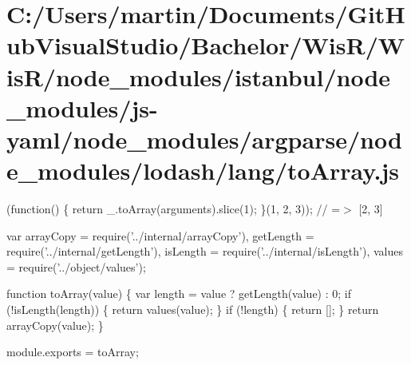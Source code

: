 \hypertarget{_c_1_2_users_2martin_2_documents_2_git_hub_visual_studio_2_bachelor_2_wis_r_2_wis_r_2node_module64fdf711fb5c2588c29c1fc5e6fb5d12}{}\section{C\+:/\+Users/martin/\+Documents/\+Git\+Hub\+Visual\+Studio/\+Bachelor/\+Wis\+R/\+Wis\+R/node\+\_\+modules/istanbul/node\+\_\+modules/js-\/yaml/node\+\_\+modules/argparse/node\+\_\+modules/lodash/lang/to\+Array.\+js}
(function() \{ return \+\_\+.\+to\+Array(arguments).slice(1); \}(1, 2, 3)); // =$>$ \mbox{[}2, 3\mbox{]}


\begin{DoxyCodeInclude}
var arrayCopy = require(\textcolor{stringliteral}{'../internal/arrayCopy'}),
    getLength = require(\textcolor{stringliteral}{'../internal/getLength'}),
    isLength = require(\textcolor{stringliteral}{'../internal/isLength'}),
    values = require(\textcolor{stringliteral}{'../object/values'});

\textcolor{keyword}{function} toArray(value) \{
  var length = value ? getLength(value) : 0;
  \textcolor{keywordflow}{if} (!isLength(length)) \{
    \textcolor{keywordflow}{return} values(value);
  \}
  \textcolor{keywordflow}{if} (!length) \{
    \textcolor{keywordflow}{return} [];
  \}
  \textcolor{keywordflow}{return} arrayCopy(value);
\}

module.exports = toArray;
\end{DoxyCodeInclude}
 